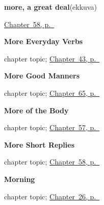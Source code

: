 \noindent\begin{minipage}[t]{\linewidth}
\raggedright
\textbf{more, a great deal}\enspace\emph{}\enspace(ekkuva)\par
\footnotesize \hyperref[ch:te-more-replies]{Chapter~58, p.~\pageref*{ch:te-more-replies}}
\end{minipage}\par\smallskip

\noindent\begin{minipage}[t]{\linewidth}
\raggedright
\textbf{More Everyday Verbs}\par
\footnotesize chapter topic; \hyperref[ch:te-more-verbs]{Chapter~43, p.~\pageref*{ch:te-more-verbs}}
\end{minipage}\par\smallskip

\noindent\begin{minipage}[t]{\linewidth}
\raggedright
\textbf{More Good Manners}\par
\footnotesize chapter topic; \hyperref[ch:te-more-manners]{Chapter~65, p.~\pageref*{ch:te-more-manners}}
\end{minipage}\par\smallskip

\noindent\begin{minipage}[t]{\linewidth}
\raggedright
\textbf{More of the Body}\par
\footnotesize chapter topic; \hyperref[ch:te-more-body]{Chapter~57, p.~\pageref*{ch:te-more-body}}
\end{minipage}\par\smallskip

\noindent\begin{minipage}[t]{\linewidth}
\raggedright
\textbf{More Short Replies}\par
\footnotesize chapter topic; \hyperref[ch:te-more-replies]{Chapter~58, p.~\pageref*{ch:te-more-replies}}
\end{minipage}\par\smallskip

\noindent\begin{minipage}[t]{\linewidth}
\raggedright
\textbf{Morning}\par
\footnotesize chapter topic; \hyperref[ch:te-morning]{Chapter~26, p.~\pageref*{ch:te-morning}}
\end{minipage}\par\smallskip

